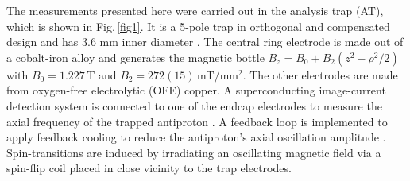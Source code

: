 \documentclass[preprint%
]{elsarticle}
\begin{document}
The measurements presented here were carried out in the analysis trap (AT), which is shown in Fig.$\,$\ref{fig1}. It is a 5-pole trap in orthogonal and compensated design and has 3.6 mm inner diameter \cite{CCRodegheri2012}. The central ring electrode is made out of a cobalt-iron alloy and generates the magnetic bottle $B_z=B_0 + B_2 (z^2-\rho^2/2)$ with $B_0=1.227\,$T and $B_2 = 272(15)\,$mT/mm$^2$. The other electrodes are made from oxygen-free electrolytic (OFE) copper. A superconducting image-current detection system is connected to one of the endcap electrodes to measure the axial frequency of the trapped antiproton \cite{Wine,Ulm,HiroRSI2016}. A feedback loop is implemented to apply feedback cooling to reduce the antiproton's axial oscillation amplitude \cite{DUrso2003}. Spin-transitions are induced by irradiating an oscillating magnetic field via a spin-flip coil placed in close vicinity to the trap electrodes. 
\end{document}
